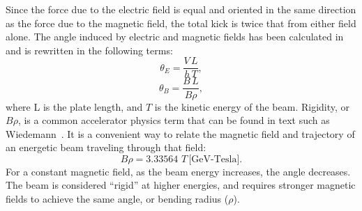 \documentclass[aps,prab,preprint,groupedaddress,linenumbers]{revtex4-2}
\begin{document}
Since the force due to the electric field is equal and oriented in the same direction as the force due to the magnetic field, 
the total kick is twice that from either field alone.  
The angle induced by electric and magnetic fields has been calculated in~\cite{iukicker, Wiedemann}
and is rewritten in the following terms:  
\begin{equation}
\theta_E= \frac{V\,L}{h\,T},
\end{equation}
\begin{equation}
\theta_B= \frac{B\,L}{B\rho},
\end{equation}
where L is the plate length, and $T$ is the kinetic energy of the beam. 
Rigidity, or $B\rho$, is a common accelerator physics term that can be found in text such as Wiedemann~\cite{Wiedemann}. 
It is a convenient way to relate the magnetic field and trajectory of an energetic beam traveling through that field:
\begin{equation}
B\rho=3.33564\,\,T\, \text{[GeV-Tesla]}.
\end{equation} 
For a constant magnetic field, as the beam energy increases, the angle decreases. 
The beam is considered ``rigid'' at higher energies, 
and requires stronger magnetic fields to achieve the same angle, or bending radius ($\rho$).
\end{document}
